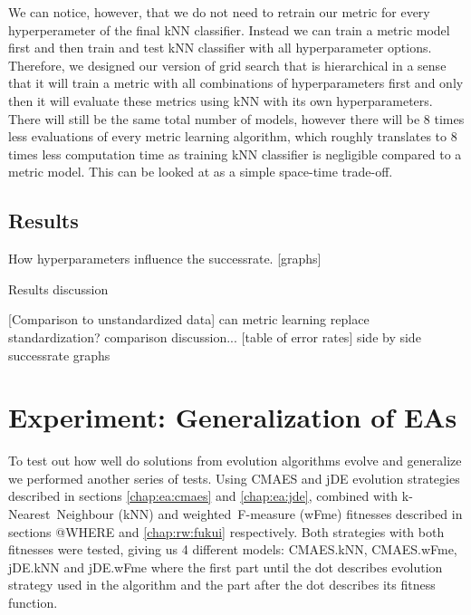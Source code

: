 \documentclass[12pt,a4paper]{report}
\begin{document}
We can notice, however, that we do not need to retrain our metric for every hyperperameter of the final kNN classifier. Instead we can train a metric model first and then train and test kNN classifier with all hyperparameter options. Therefore, we designed our version of grid search that is hierarchical in a sense that it will train a metric with all combinations of hyperparameters first and only then it will evaluate these metrics using kNN with its own hyperparameters. There will still be the same total number of models, however there will be 8 times less evaluations of every metric learning algorithm, which roughly translates to 8 times less computation time as training kNN classifier is negligible compared to a metric model. This can be looked at as a simple space-time trade-off.


\subsection{Results}

How hyperparameters influence the successrate. [graphs] %

Results discussion %



[Comparison to unstandardized data]
can metric learning replace standardization? %
comparison discussion... %
[table of error rates] %
side by side successrate graphs %





\section{Experiment: Generalization of EAs} \label{chap:exp:fitness}

To test out how well do solutions from evolution algorithms evolve and generalize we performed another series of tests. Using CMAES and jDE evolution strategies described in sections \ref{chap:ea:cmaes} and \ref{chap:ea:jde}, combined with k-Nearest~Neighbour (kNN) and weighted~F-measure (wFme) fitnesses described in sections @WHERE and \ref{chap:rw:fukui} respectively. Both strategies with both fitnesses were tested, giving us 4 different models: CMAES.kNN, CMAES.wFme, jDE.kNN and jDE.wFme where the first part until the dot describes evolution strategy used in the algorithm and the part after the dot describes its fitness function.
\end{document}
